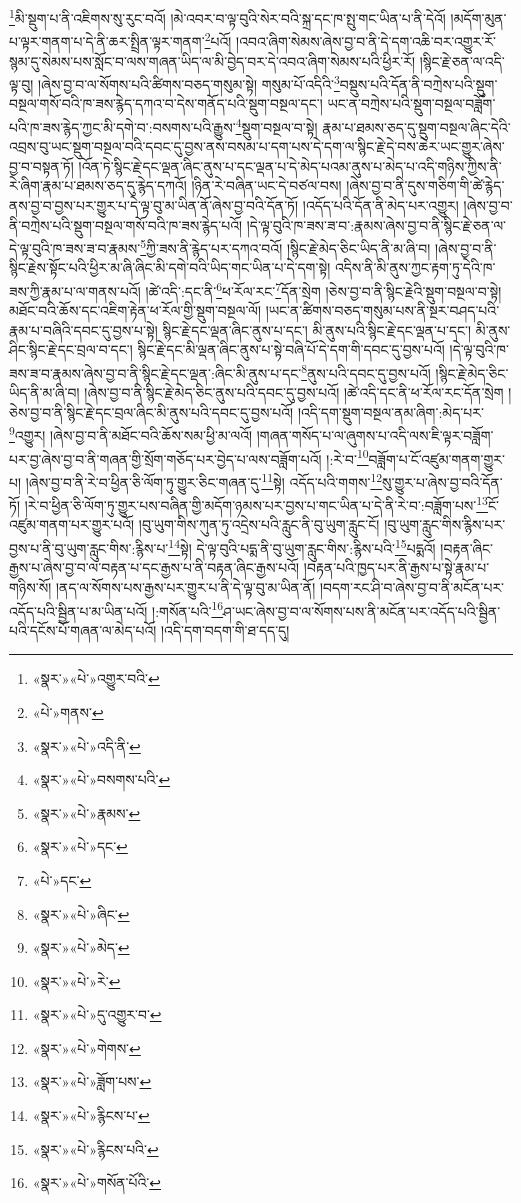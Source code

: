 \footnote{«སྣར་»«པེ་»འགྱུར་བའི་}མི་སྡུག་པ་ནི་འཇིགས་སུ་རུང་བའོ། །མེ་འབར་བ་ལྟ་བུའི་སེར་བའི་སྐྲ་དང་ཁ་སྤུ་གང་ཡིན་པ་ནི་དེའོ། །མདོག་མུན་པ་ལྟར་གནག་པ་དེ་ནི་ཆར་སྤྲིན་ལྟར་གནག་\footnote{«པེ་»གནས་}པའོ། །འབའ་ཞིག་སེམས་ཞེས་བྱ་བ་ནི་དེ་དག་འཆི་བར་འགྱུར་རོ་སྙམ་དུ་སེམས་པས་སློང་བ་ལས་གཞན་ཡིད་ལ་མི་བྱེད་བར་དེ་འབའ་ཞིག་སེམས་པའི་ཕྱིར་རོ། །སྙིང་རྗེ་ཅན་ལ་འདི་ལྟ་བུ། །ཞེས་བྱ་བ་ལ་སོགས་པའི་ཚིགས་བཅད་གསུམ་སྟེ། གསུམ་པོ་འདིའི་\footnote{«སྣར་»«པེ་»འདི་ནི་}བསྡུས་པའི་དོན་ནི་བཀྲེས་པའི་སྡུག་བསྔལ་གསོ་བའི་ཁ་ཟས་རྙེད་དཀའ་བ་དེས་གནོད་པའི་སྡུག་བསྔལ་དང་། ཡང་ན་བཀྲེས་པའི་སྡུག་བསྔལ་བཟློག་པའི་ཁ་ཟས་རྙེད་ཀྱང་མི་དགེ་བ་:བསགས་པའི་རྒྱུས་\footnote{«སྣར་»«པེ་»བསགས་པའི་}སྡུག་བསྔལ་བ་སྟེ། རྣམ་པ་ཐམས་ཅད་དུ་སྡུག་བསྔལ་ཞིང་དེའི་འབྲས་བུ་ཡང་སྡུག་བསྔལ་བའི་དབང་དུ་བྱས་ནས་བསམ་པ་དག་པས་དེ་དག་ལ་སྙིང་རྗེ་དེ་བས་ཆེར་ཡང་གྱུར་ཞེས་བྱ་བ་བསྟན་ཏོ། །འོན་ཏེ་སྙིང་རྗེ་དང་ལྡན་ཞིང་ནུས་པ་དང་ལྡན་པ་དེ་མེད་པའམ་ནུས་པ་མེད་པ་འདི་གཉིས་ཀྱིས་ནི་རེ་ཞིག་རྣམ་པ་ཐམས་ཅད་དུ་རྙེད་དཀའོ། །ཉིན་རེ་བཞིན་ཡང་དེ་བཙལ་བས། །ཞེས་བྱ་བ་ནི་དུས་གཅིག་གི་ཚེ་རྙེད་ནས་བྱ་བ་བྱས་པར་གྱུར་པ་དེ་ལྟ་བུ་མ་ཡིན་ནོ་ཞེས་བྱ་བའི་དོན་ཏོ། །འདོད་པའི་དོན་ནི་མེད་པར་འགྱུར། །ཞེས་བྱ་བ་ནི་བཀྲེས་པའི་སྡུག་བསྔལ་གསོ་བའི་ཁ་ཟས་རྙེད་པའོ། །དེ་ལྟ་བུའི་ཁ་ཟས་ཟ་བ་:རྣམས་ཞེས་བྱ་བ་ནི་སྙིང་རྗེ་ཅན་ལ་དེ་ལྟ་བུའི་ཁ་ཟས་ཟ་བ་རྣམས་\footnote{«སྣར་»«པེ་»རྣམས་}ཀྱི་ཟས་ནི་རྙེད་པར་དཀའ་བའོ། །སྙིང་རྗེ་མེད་ཅིང་ཡིད་ནི་མ་ཞི་བ། །ཞེས་བྱ་བ་ནི་སྙིང་རྗེས་སྟོང་པའི་ཕྱིར་མ་ཞི་ཞིང་མི་དགེ་བའི་ཡིད་གང་ཡིན་པ་དེ་དག་སྟེ། འདིས་ནི་མི་ནུས་ཀྱང་རྟག་ཏུ་དེའི་ཁ་ཟས་ཀྱི་རྣམ་པ་ལ་གནས་པའོ། །ཚེ་འདི་:དང་ནི་\footnote{«སྣར་»«པེ་»དང་}ཕ་རོལ་རང་\footnote{«པེ་»དང་}དོན་སྲེག །ཅེས་བྱ་བ་ནི་སྙིང་རྗེའི་སྡུག་བསྔལ་བ་སྟེ། མཐོང་བའི་ཆོས་དང་འཇིག་རྟེན་ཕ་རོལ་གྱི་སྡུག་བསྔལ་ལོ། །ཡང་ན་ཚིགས་བཅད་གསུམ་པས་ནི་སྔར་བཤད་པའི་རྣམ་པ་བཞིའི་དབང་དུ་བྱས་པ་སྟེ། སྙིང་རྗེ་དང་ལྡན་ཞིང་ནུས་པ་དང་། མི་ནུས་པའི་སྙིང་རྗེ་དང་ལྡན་པ་དང་། མི་ནུས་ཤིང་སྙིང་རྗེ་དང་བྲལ་བ་དང་། སྙིང་རྗེ་དང་མི་ལྡན་ཞིང་ནུས་པ་སྟེ་བཞི་པོ་དེ་དག་གི་དབང་དུ་བྱས་པའོ། །དེ་ལྟ་བུའི་ཁ་ཟས་ཟ་བ་རྣམས་ཞེས་བྱ་བ་ནི་སྙིང་རྗེ་དང་ལྡན་:ཞིང་མི་ནུས་པ་དང་\footnote{«སྣར་»«པེ་»ཞིང་}ནུས་པའི་དབང་དུ་བྱས་པའོ། །སྙིང་རྗེ་མེད་ཅིང་ཡིད་ནི་མ་ཞི་བ། །ཞེས་བྱ་བ་ནི་སྙིང་རྗེ་མེད་ཅིང་ནུས་པའི་དབང་དུ་བྱས་པའོ། །ཚེ་འདི་དང་ནི་ཕ་རོལ་རང་དོན་སྲེག །ཅེས་བྱ་བ་ནི་སྙིང་རྗེ་དང་བྲལ་ཞིང་མི་ནུས་པའི་དབང་དུ་བྱས་པའོ། །འདི་དག་སྡུག་བསྔལ་ནམ་ཞིག་:མེད་པར་\footnote{«སྣར་»«པེ་»མེད་}འགྱུར། །ཞེས་བྱ་བ་ནི་མཐོང་བའི་ཆོས་སམ་ཕྱི་མ་ལའོ། །གཞན་གསོད་པ་ལ་ཞུགས་པ་འདི་ལས་ཇི་ལྟར་བཟློག་པར་བྱ་ཞེས་བྱ་བ་ནི་གཞན་གྱི་སྲོག་གཅོད་པར་བྱེད་པ་ལས་བཟློག་པའོ། །:རེ་བ་\footnote{«སྣར་»«པེ་»རེ་}བཟློག་པ་ངོ་འཛུམ་གནག་གྱུར་པ། །ཞེས་བྱ་བ་ནི་རེ་བ་ཕྱིན་ཅི་ལོག་ཏུ་གྱུར་ཅིང་གཞན་དུ་\footnote{«སྣར་»«པེ་»དུ་འགྱུར་བ་}སྟེ། འདོད་པའི་གགས་\footnote{«སྣར་»«པེ་»གེགས་}སུ་གྱུར་པ་ཞེས་བྱ་བའི་དོན་ཏོ། །རེ་བ་ཕྱིན་ཅི་ལོག་ཏུ་གྱུར་པས་བཞིན་གྱི་མདོག་ཉམས་པར་བྱས་པ་གང་ཡིན་པ་དེ་ནི་རེ་བ་:བཟློག་པས་\footnote{«སྣར་»«པེ་»ཟློག་པས་}ངོ་འཛུམ་གནག་པར་གྱུར་པའོ། །བུ་ཡུག་གིས་ཀུན་ཏུ་འདྲེས་པའི་རླུང་ནི་བུ་ཡུག་རླུང་ངོ། །བུ་ཡུག་རླུང་གིས་རྙིས་པར་བྱས་པ་ནི་བུ་ཡུག་རླུང་གིས་:རྙིས་པ་\footnote{«སྣར་»«པེ་»རྙིངས་པ་}སྟེ། དེ་ལྟ་བུའི་པདྨ་ནི་བུ་ཡུག་རླུང་གིས་:རྙིས་པའི་\footnote{«སྣར་»«པེ་»རྙིངས་པའི་}པདྨའོ། །བརྟན་ཞིང་རྒྱས་པ་ཞེས་བྱ་བ་ལ་བརྟན་པ་དང་རྒྱས་པ་ནི་བརྟན་ཞིང་རྒྱས་པའོ། །བརྟན་པའི་ཁྱད་པར་ནི་རྒྱས་པ་སྟེ་རྣམ་པ་གཉིས་སོ། །ནད་ལ་སོགས་པས་རྒྱས་པར་གྱུར་པ་ནི་དེ་ལྟ་བུ་མ་ཡིན་ནོ། །བདག་རང་ཤི་བ་ཞེས་བྱ་བ་ནི་མངོན་པར་འདོད་པའི་སྦྱིན་པ་མ་ཡིན་པའོ། །:གསོན་པའི་\footnote{«སྣར་»«པེ་»གསོན་པོའི་}ཤ་ཡང་ཞེས་བྱ་བ་ལ་སོགས་པས་ནི་མངོན་པར་འདོད་པའི་སྦྱིན་པའི་དངོས་པོ་གཞན་ལ་མེད་པའོ། །འདི་དག་བདག་གི་ཐ་དད་དུ། 